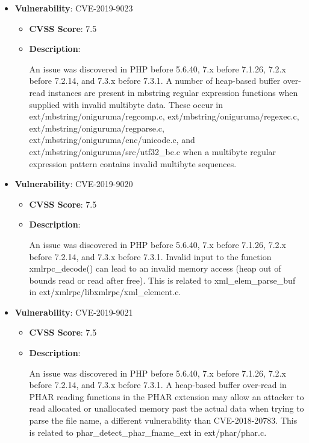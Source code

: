 \documentclass{article}
\begin{document}
\begin{itemize}
        \item \textbf{Vulnerability}: CVE-2019-9023
        \begin{itemize}
            \item \textbf{CVSS Score}:  7.5 
            \item \textbf{Description}:
            \parbox[t]{0.9\linewidth}{
                \ttfamily An issue was discovered in PHP before 5.6.40, 7.x before 7.1.26, 7.2.x before 7.2.14, and 7.3.x before 7.3.1. A number of heap-based buffer over-read instances are present in mbstring regular expression functions when supplied with invalid multibyte data. These occur in ext/mbstring/oniguruma/regcomp.c, ext/mbstring/oniguruma/regexec.c, ext/mbstring/oniguruma/regparse.c, ext/mbstring/oniguruma/enc/unicode.c, and ext/mbstring/oniguruma/src/utf32\_be.c when a multibyte regular expression pattern contains invalid multibyte sequences.
            }
        \end{itemize}
    
        \item \textbf{Vulnerability}: CVE-2019-9020
        \begin{itemize}
            \item \textbf{CVSS Score}:  7.5 
            \item \textbf{Description}:
            \parbox[t]{0.9\linewidth}{
                \ttfamily An issue was discovered in PHP before 5.6.40, 7.x before 7.1.26, 7.2.x before 7.2.14, and 7.3.x before 7.3.1. Invalid input to the function xmlrpc\_decode() can lead to an invalid memory access (heap out of bounds read or read after free). This is related to xml\_elem\_parse\_buf in ext/xmlrpc/libxmlrpc/xml\_element.c.
            }
        \end{itemize}
    
        \item \textbf{Vulnerability}: CVE-2019-9021
        \begin{itemize}
            \item \textbf{CVSS Score}:  7.5 
            \item \textbf{Description}:
            \parbox[t]{0.9\linewidth}{
                \ttfamily An issue was discovered in PHP before 5.6.40, 7.x before 7.1.26, 7.2.x before 7.2.14, and 7.3.x before 7.3.1. A heap-based buffer over-read in PHAR reading functions in the PHAR extension may allow an attacker to read allocated or unallocated memory past the actual data when trying to parse the file name, a different vulnerability than CVE-2018-20783. This is related to phar\_detect\_phar\_fname\_ext in ext/phar/phar.c.
            }
        \end{itemize}
    

\end{itemize}
\end{document}
